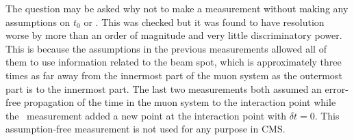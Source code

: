 The question may be asked why not to make a measurement without making any assumptions on $t_0$ or \invbeta. This was checked but it was found to have
resolution worse by more than an order of magnitude and very little discriminatory power.
This is because the assumptions in the previous measurements allowed all of them to use information
related to the beam spot, which is approximately three times as far away from the innermost part of the muon system as the outermost part is to the innermost part.
The last two measurements both assumed an error-free propagation of the time in the muon system to the interaction point while the \invbeta\ measurement
added a new point at the interaction point with $\delta t = 0$. This assumption-free measurement is not used for any purpose in CMS.


